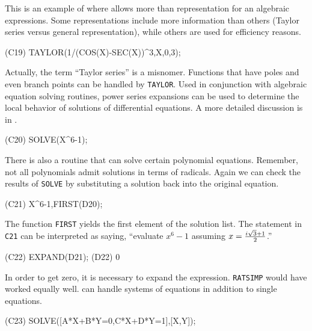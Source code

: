 This is an example of where {\Macsyma} allows more than representation
for an algebraic expressions.  Some representations include more
information than others (Taylor series versus general representation),
while others are used for efficiency reasons.

\begin{code}
(C19) TAYLOR(1/(COS(X)-SEC(X))^3,X,0,3);
\end{code}
Actually, the term ``Taylor series'' is a misnomer.  Functions that have
poles and even branch points can be handled by {\tt TAYLOR}.  Used in
conjunction with algebraic equation solving routines, power series
expansions can be used to determine the local behavior of solutions of
differential equations.  A more detailed discussion is in
.  
\begin{code}
(C20) SOLVE(X^6-1);
\end{code}

There is also a routine that can solve certain polynomial equations.
Remember, not all polynomials admit solutions in terms of radicals.
Again we can check the results of {\tt SOLVE} by substituting a solution
back into the original equation.
\begin{code}
(C21) X^6-1,FIRST(D20);
\end{code}
The function {\tt FIRST} yields the first element of the solution list.
The statement in {\tt C21} can be interpreted as saying, ``evaluate
$x^6 - 1$ assuming $x = {i \sqrt{3} + 1 \over 2}$.''
\begin{code}
(C22) EXPAND(D21);
(D22)                                 0
\end{code}
In order to get zero, it is necessary to expand the expression.  {\tt RATSIMP}
would have worked equally well.  {\Macsyma} can handle systems of equations 
in addition to single equations.
\begin{code}
(C23) SOLVE([A*X+B*Y=0,C*X+D*Y=1],[X,Y]);
\end{code}

